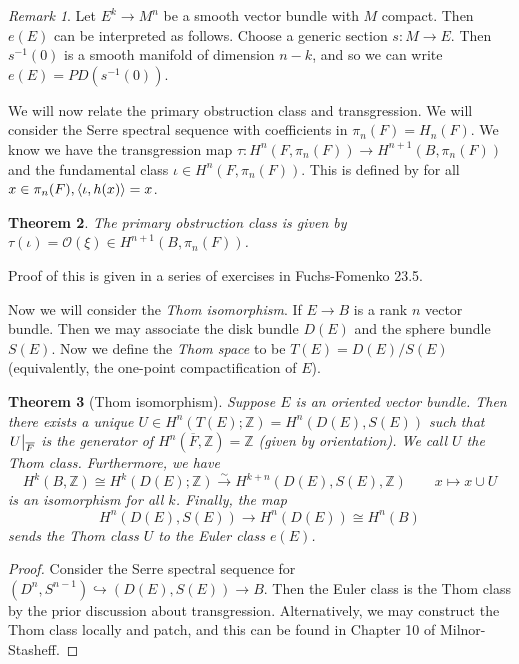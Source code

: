 \documentclass[leqno, openany]{memoir}
\newtheorem{thm}{Theorem}[section]
\theoremstyle{definition}
\theoremstyle{remark}
\newtheorem{rmk}[thm]{Remark}
\theoremstyle{plain}
\theoremstyle{definition}
\theoremstyle{remark}
\newcommand{\Z}{\mathbb{Z}}
\newcommand{\mc}[1]{\mathcal{#1}}
\newcommand{\ol}[1]{\overline{#1}}
\begin{document}
\begin{rmk} Let $E^k \to M^n$ be a smooth vector bundle with $M$ compact. Then
    $e(E)$ can be interpreted as follows. Choose a generic section $s \colon M
    \to E$. Then $s^{-1}(0)$ is a smooth manifold of dimension $n-k$, and so we
    can write $e(E) = PD(s^{-1}(0))$.  \end{rmk}

We will now relate the primary obstruction class and transgression. We will
consider the Serre spectral sequence with coefficients in $\pi_n(F) = H_n(F)$.
We know we have the transgression map $\tau \colon H^n(F, \pi_n(F)) \to
H^{n+1}(B, \pi_n(F))$ and the fundamental class $\iota \in H^n(F, \pi_n(F))$.
This is defined by for all $x \in \pi_n(F), \ev{\iota, h(x)} = x$.

\begin{thm} The primary obstruction class is given by $\tau(\iota) =
\mc{O}(\xi) \in H^{n+1}(B, \pi_n(F))$.  \end{thm} Proof of this is given in a
series of exercises in Fuchs-Fomenko 23.5.

Now we will consider the \textit{Thom isomorphism}. If $E \to B$ is a rank $n$
vector bundle. Then we may associate the disk bundle $D(E)$ and the sphere
bundle $S(E)$. Now we define the \textit{Thom space} to be $T(E) = D(E) / S(E)$
(equivalently, the one-point compactification of $E$).

\begin{thm}[Thom isomorphism] Suppose $E$ is an oriented vector bundle. Then
    there exists a unique $U \in H^n(T(E); \Z) = H^n(D(E), S(E))$ such that
    $\eval{U}_{\ol{F}}$ is the generator of $H^n(\ol{F}, \Z) = \Z$ (given by
    orientation). We call $U$ the \textit{Thom class}. Furthermore, we have \[
        H^k(B, \Z) \cong H^k(D(E); \Z) \xrightarrow{\sim} H^{k+n}(D(E), S(E),
        \Z) \qquad x \mapsto x \cup U \] is an isomorphism for all $k$.
        Finally, the map \[ H^n(D(E), S(E)) \to H^n(D(E)) \cong H^n(B) \] sends
    the Thom class $U$ to the Euler class $e(E)$.  \end{thm}

\begin{proof} Consider the Serre spectral sequence for $(D^n, S^{n-1})
    \hookrightarrow (D(E), S(E)) \to B$. Then the Euler class is the Thom class
    by the prior discussion about transgression. Alternatively, we may
    construct the Thom class locally and patch, and this can be found in
    Chapter 10 of Milnor-Stasheff.  \end{proof}
\end{document}
